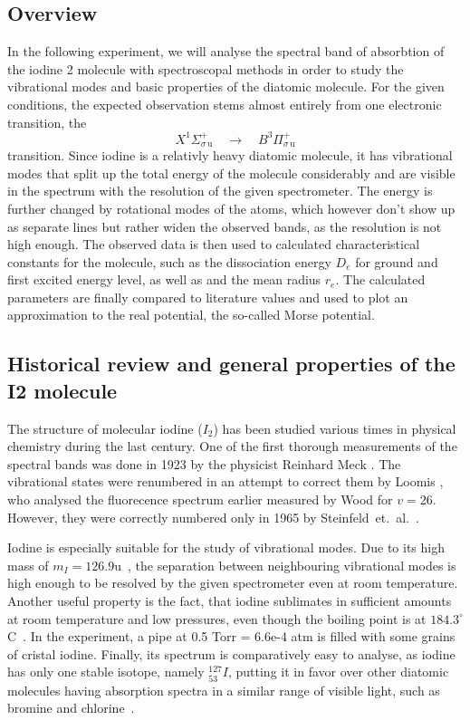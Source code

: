 \subsection{Overview}
In the following experiment, we will analyse the spectral band of absorbtion of the iodine 2 molecule 
with spectroscopal methods in order to study the vibrational modes and basic properties 
of the diatomic molecule. 
For the given conditions, the expected observation stems almost 
entirely from one electronic transition, the 
\begin{equation}
     X ^1\Sigma_{\sigma \, \mathrm{u}}^{+} \quad \rightarrow \quad B ^3\Pi_{\sigma \, \mathrm{u}}^{+}
\end{equation}
transition. Since iodine is a relativly heavy diatomic molecule, it has vibrational modes that 
split up the total energy of the molecule considerably and are visible in the spectrum with the 
resolution of the given spectrometer. The energy is further changed by rotational modes of the 
atoms, which however don't show up as separate lines but rather widen the observed bands, as the 
resolution is not high enough. 
The observed data is then used to calculated characteristical constants for the molecule, such as 
the dissociation energy $D_e$ for ground and first excited energy level, as well as 
and the mean radius $r_e$. The calculated parameters are finally compared to literature values 
and used to plot an approximation to the real potential, the so-called Morse potential.  

\subsection{Historical review and general properties of the I2 molecule}
The structure of molecular iodine ($I_2$) has been studied various times in physical chemistry 
during the last century. One of the first thorough measurements of the spectral bands was done in 
1923 by the physicist Reinhard Meck \cite{mecke1923bandenspektrum}. The vibrational states 
were renumbered in an attempt to correct them by Loomis \cite{loomis1927correlation}, who analysed 
the fluorecence spectrum earlier measured by Wood \cite{wood1911} for $v = 26$. However, they were 
correctly numbered only in 1965 by Steinfeld~et.~al.~\cite{steinfeld1965spectroscopic}. 

Iodine is especially suitable for the study of vibrational modes. Due to its high mass of 
$m_{I} = 126.9$u~\cite{weisstein}, the separation between neighbouring vibrational modes 
is high enough to be resolved by 
the given spectrometer even at room temperature. Another useful property is the fact, that
iodine sublimates in sufficient amounts at room temperature and low pressures, even though 
the boiling point is at  $184.3^{\circ}$C~\cite{weisstein}. In the experiment, a pipe at 0.5 Torr = 6.6e-4 atm 
is filled with some grains of cristal iodine. Finally, its spectrum is comparatively easy 
to analyse, as iodine has only one stable isotope, namely $_53^127 I$, putting it in favor over 
other diatomic molecules having absorption spectra in a similar range of visible light, such 
as bromine and chlorine~\cite{staatsexamen}.
